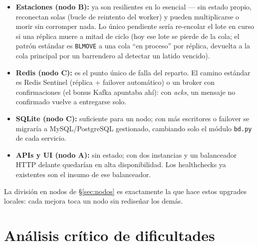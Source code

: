 \documentclass[12pt,a4paper]{article}
\begin{document}
\begin{itemize}[leftmargin=*]
  \item \textbf{Estaciones (nodo B):} ya son resilientes en lo esencial — sin
        estado propio, reconectan solas (bucle de reintento del worker) y
        pueden multiplicarse o morir sin corromper nada. Lo único pendiente
        sería re-encolar el lote en curso si una réplica muere a mitad de
        ciclo (hoy ese lote se pierde de la cola; el patrón estándar es
        \texttt{BLMOVE} a una cola ``en proceso'' por réplica, devuelta a la
        cola principal por un barrendero al detectar un latido vencido).
  \item \textbf{Redis (nodo C):} es el punto único de falla del reparto. El
        camino estándar es Redis Sentinel (réplica + failover automático) o un
        broker con confirmaciones (el bonus Kafka apuntaba ahí): con
        \emph{acks}, un mensaje no confirmado vuelve a entregarse solo.
  \item \textbf{SQLite (nodo C):} suficiente para un nodo; con más escritores
        o failover se migraría a MySQL/PostgreSQL gestionado, cambiando solo
        el módulo \texttt{bd.py} de cada servicio.
  \item \textbf{APIs y UI (nodo A):} sin estado; con dos instancias y un
        balanceador HTTP delante quedarían en alta disponibilidad. Los
        healthchecks ya existentes son el insumo de ese balanceador.
\end{itemize}

La división en nodos de §\ref{sec:nodos} es exactamente la que hace estos
upgrades locales: cada mejora toca un nodo sin rediseñar los demás.

\section{Análisis crítico de dificultades}
\label{sec:dificultades}
\end{document}
